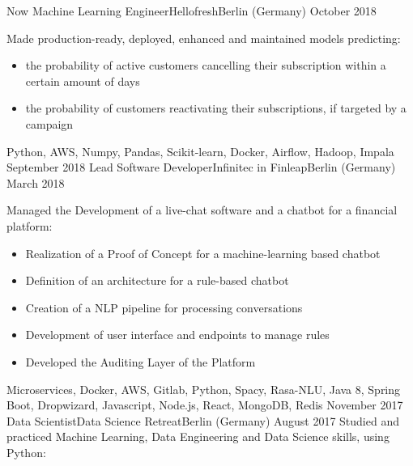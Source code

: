 %
%
%
\begin{experiences}
 \experience
    {Now}       {Machine Learning Engineer}{Hellofresh}{Berlin (Germany)}
    {October 2018}  {Made production-ready, deployed, enhanced and maintained models predicting: 
                      \begin{itemize}
                      \item the probability of active customers cancelling their subscription within a certain amount of days
					  \item the probability of customers reactivating their subscriptions, if targeted by a campaign  
                      \end{itemize}
                    }
                    {Python, AWS, Numpy, Pandas, Scikit-learn, Docker, Airflow, Hadoop, Impala}
  \emptySeparator
  \experience
    {September 2018}       {Lead Software Developer}{Infinitec in Finleap}{Berlin (Germany)}
    {March 2018}  {Managed the Development of a live-chat software and a chatbot for a financial platform: 
                      \begin{itemize}
                      \item Realization of a Proof of Concept for a machine-learning based chatbot
					  \item Definition of an architecture for a rule-based chatbot	
                      \item Creation of a NLP pipeline for processing conversations 
                      \item Development of user interface and endpoints to manage rules
    				  \item Developed the Auditing Layer of the Platform
                      \end{itemize}
                    }
                    {Microservices, Docker, AWS, Gitlab, Python, Spacy, Rasa-NLU, Java 8, Spring Boot, Dropwizard, Javascript, Node.js, React, MongoDB, Redis}
  \emptySeparator
  \experience
    {November 2017}   {Data Scientist}{Data Science Retreat}{Berlin (Germany)}
    {August 2017}  {Studied and practiced Machine Learning, Data Engineering and Data Science skills, using Python: 
}
\end{experiences}
